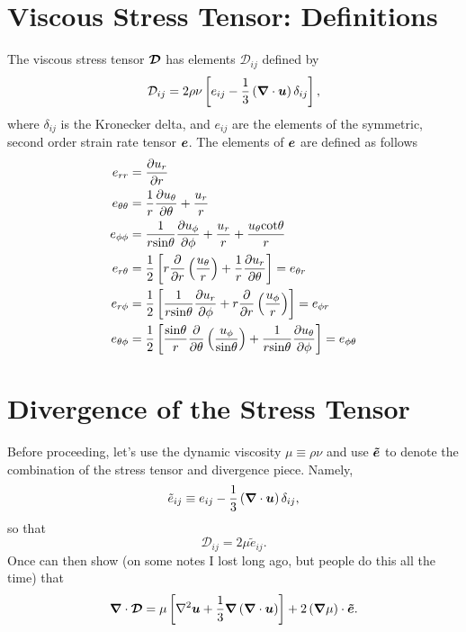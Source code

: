 \documentclass[10pt, letterpaper]{article}
\begin{document}
{\section{Viscous Stress Tensor:  Definitions}
The viscous stress tensor $\boldsymbol{\mathcal{D}}$ has elements $\mathcal{D}_{ij}$ defined by
\begin{equation}
\label{eq:Dij}
\mathcal{D}_{ij}=2\rho\nu\left[e_{ij}-\frac{1}{3}\left(\boldsymbol{\nabla}\cdot\boldsymbol{u}\right)\delta_{ij}\right],
\end{equation}
where $\delta_{ij}$ is the Kronecker delta, and $e_{ij}$ are the elements of the symmetric, second order strain rate tensor $\boldsymbol{e}$.  The elements of $\boldsymbol{e}$ are defined as follows
\begin{align}
e_{rr}& = \frac{\partial u_r}{\partial r}                                              \\
e_{\theta\theta}& = \frac{1}{r}\frac{\partial u_\theta}{\partial\theta}+\frac{u_r}{r}  \\
e_{\phi\phi}& = \frac{1}{r\mathrm{sin}\theta}\frac{\partial u_\phi}{\partial\phi} +\frac{u_r}{r} + \frac{u_\theta\mathrm{cot}\theta}{r} \\
e_{r\theta}& = \frac{1}{2}\left[ r\frac{\partial}{\partial r}\left( \frac{u_\theta}{r} \right) +  \frac{1}{r}\frac{\partial u_r}{\partial\theta}  \right]    = e_{\theta r}              \\
e_{r\phi}&  = \frac{1}{2}\left[ \frac{1}{r\mathrm{sin}\theta}\frac{\partial u_r}{\partial\phi} + r\frac{\partial}{\partial r}\left(\frac{u_\phi}{r} \right)   \right]   = e_{\phi r}\\
e_{\theta\phi}& = \frac{1}{2}\left[ \frac{\mathrm{sin}\theta}{r}\frac{\partial}{\partial\theta}\left( \frac{u_\phi}{\mathrm{sin}\theta} \right) +  \frac{1}{r\mathrm{sin}\theta}\frac{\partial u_\theta}{\partial\phi}  \right] = e_{\phi\theta}
\end{align}
 
\section{Divergence of the Stress Tensor}
Before proceeding, let's use the dynamic viscosity $\mu\equiv\rho\nu$ and use $\boldsymbol{\tilde{e}}$ to denote the combination of the stress tensor and divergence piece.  Namely,
\begin{equation}
\label{eq:etwiddle}
\tilde{e}_{ij} \equiv e_{ij} - \frac{1}{3}\left(\boldsymbol{\nabla}\cdot\boldsymbol{u}\right)\delta_{ij},
\end{equation}
so that 
\begin{equation}
\mathcal{D}_{ij} = 2\mu\tilde{e}_{ij}.
\end{equation}
Once can then show (on some notes I lost long ago, but people do this all the time) that
\begin{equation}
\boldsymbol{\nabla}\cdot\boldsymbol{\mathcal{D}} = \mu\left[\nabla^2\boldsymbol{u} + \frac{1}{3}\boldsymbol{\nabla}\left(\boldsymbol{\nabla}\cdot\boldsymbol{u}\right)  \right] + 2\left(\boldsymbol{\nabla}\mu\right)\cdot\boldsymbol{\tilde{e}}.
\end{equation}

}
\end{document}

